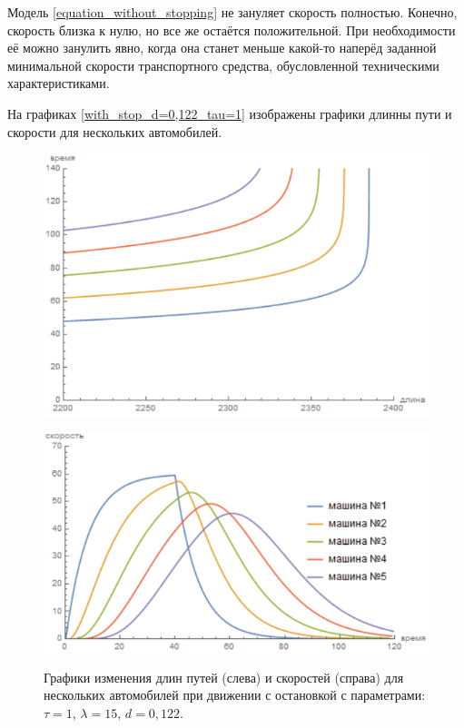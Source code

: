 \documentclass[12pt, a4paper]{extarticle}
\numberwithin{equation}{section}
\begin{document}
Модель \eqref{equation_without_stopping} не зануляет скорость полностью. Конечно, скорость близка к нулю, но все же остаётся положительной. При необходимости её можно занулить явно, когда она станет меньше какой-то наперёд заданной минимальной скорости транспортного средства, обусловленной техническими характеристиками. 
 
На графиках \eqref{with_stop_d=0,122_tau=1} изображены графики длинны пути и скорости для нескольких автомобилей. 
 \begin{figure}[h!]
 	\begin{center}
 		\begin{minipage}[h!]{0.48\linewidth}
 			\includegraphics[width=1\linewidth,height=0.2\textheight]
 			{Images/distance_with_stop_d=0,122_tau=1.png}
 			\label{distance_with_stop_d=0,122_tau=1}
 		\end{minipage}
 		\hfill 
 		\begin{minipage}[h!]{0.48\linewidth}
 			\includegraphics[width=1\linewidth,height=0.2\textheight]
 			{Images/speed_with_stop_d=0,122_tau=1.png}
 			\label{speed_with_stop_d=0,122_tau=1}
 		\end{minipage}
 		\label{with_stop_d=0,122_tau=1}
 		\caption{Графики изменения длин путей (слева) и скоростей (справа) для нескольких автомобилей при движении с остановкой с параметрами: $\tau=1$, $\lambda=15$, $d=0,122$.}
 	\end{center}
 \end{figure}
\end{document}
